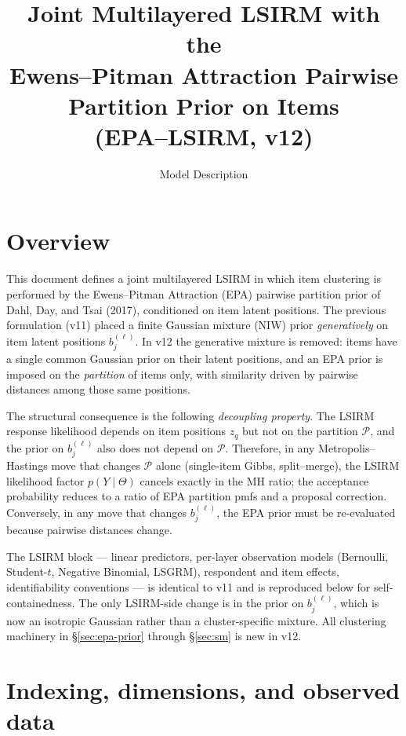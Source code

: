 \documentclass[11pt]{article}
\title{Joint Multilayered LSIRM with the\\
Ewens--Pitman Attraction Pairwise Partition Prior on Items\\
(EPA--LSIRM, v12)}
\date{Model Description}
\begin{document}
\maketitle

\section{Overview}

This document defines a joint multilayered LSIRM in which item clustering is
performed by the Ewens--Pitman Attraction (EPA) pairwise partition prior of
Dahl, Day, and Tsai (2017), conditioned on item latent positions.  The
previous formulation (v11) placed a finite Gaussian mixture (NIW) prior
\emph{generatively} on item latent positions $b_j^{(\ell)}$.  In v12 the
generative mixture is removed: items have a single common Gaussian prior on
their latent positions, and an EPA prior is imposed on the \emph{partition}
of items only, with similarity driven by pairwise distances among those same
positions.

The structural consequence is the following \emph{decoupling property}.  The
LSIRM response likelihood depends on item positions $z_q$ but not on the
partition $\mathcal{P}$, and the prior on $b_j^{(\ell)}$ also does not depend
on $\mathcal{P}$.  Therefore, in any Metropolis--Hastings move that changes
$\mathcal{P}$ alone (single-item Gibbs, split--merge), the LSIRM likelihood
factor $p(Y\mid\Theta)$ cancels exactly in the MH ratio; the acceptance
probability reduces to a ratio of EPA partition pmfs and a proposal
correction.  Conversely, in any move that changes $b_j^{(\ell)}$, the EPA
prior must be re-evaluated because pairwise distances change.

The LSIRM block --- linear predictors, per-layer observation models
(Bernoulli, Student-$t$, Negative Binomial, LSGRM), respondent and item
effects, identifiability conventions --- is identical to v11 and is
reproduced below for self-containedness.  The only LSIRM-side change is in
the prior on $b_j^{(\ell)}$, which is now an isotropic Gaussian rather than a
cluster-specific mixture.  All clustering machinery in §\ref{sec:epa-prior}
through §\ref{sec:sm} is new in v12.

\section{Indexing, dimensions, and observed data}
\end{document}
